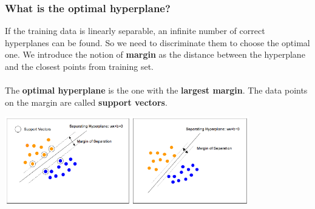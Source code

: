 \documentclass{beamer}
\begin{document}
\begin{frame}
  \frametitle{What is the optimal hyperplane?}
  If the training data is linearly separable, an infinite number of correct
  hyperplanes can be found. So we need to discriminate them to choose the
  optimal one. We introduce the notion of \textbf{margin} as the distance
  between the hyperplane and the closest points from training set.
  \\~\\
  The \textbf{optimal hyperplane} is the one with the \textbf{largest margin}.
  The data points on the margin are called \textbf{support vectors}.

  \begin{center}
    \includegraphics[height=3.8cm]{img/svm-margin.png}
  \end{center}
\end{frame}
\end{document}
